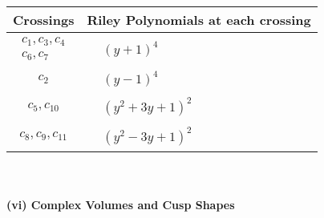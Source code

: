 \documentclass[1p]{elsarticle_modified}
\theoremstyle{definition}
\begin{document}
\begin{tabular}{m{50pt}|m{274pt}}
Crossings & \hspace{64pt}Riley Polynomials at each crossing \\
\hline $$\begin{aligned}c_{1},c_{3},c_{4}\\c_{6},c_{7}\end{aligned}$$&$\begin{aligned}
&(y+1)^4
\end{aligned}$\\
\hline $$\begin{aligned}c_{2}\end{aligned}$$&$\begin{aligned}
&(y-1)^4
\end{aligned}$\\
\hline $$\begin{aligned}c_{5},c_{10}\end{aligned}$$&$\begin{aligned}
&(y^2+3 y+1)^2
\end{aligned}$\\
\hline $$\begin{aligned}c_{8},c_{9},c_{11}\end{aligned}$$&$\begin{aligned}
&(y^2-3 y+1)^2
\end{aligned}$\\
\hline
\end{tabular}\\~\\
\newpage\flushleft \textbf{(vi) Complex Volumes and Cusp Shapes}
\end{document}
